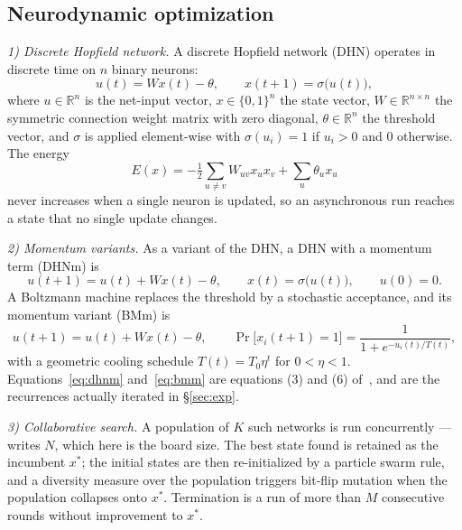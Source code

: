 \documentclass{easychair}
\newcommand{\secref}[1]{\hyperref[#1]{\textcolor{academicpurple}{\S\ref*{#1}}}}
\newcommand{\citeref}[1]{\textcolor{academicpurple}{\cite{#1}}}
\begin{document}
\subsection{Neurodynamic optimization}\label{sec:neuro}

\emph{1) Discrete Hopfield network.} A discrete Hopfield network (DHN) operates in discrete time on
$n$ binary neurons:
\begin{equation}\label{eq:dhn}
  u(t) = Wx(t) - \theta, \qquad x(t+1) = \sigma\bigl(u(t)\bigr),
\end{equation}
where $u\in\mathbb{R}^n$ is the net-input vector, $x\in\{0,1\}^n$ the state vector,
$W\in\mathbb{R}^{n\times n}$ the symmetric connection weight matrix with zero diagonal,
$\theta\in\mathbb{R}^n$ the threshold vector, and $\sigma$ is applied element-wise with
$\sigma(u_i) = 1$ if $u_i > 0$ and $0$ otherwise. The energy
\begin{equation}\label{eq:E}
  E(x) = -\tfrac12\sum_{u\neq v}W_{uv}x_ux_v + \sum_u \theta_u x_u
\end{equation}
never increases when a single neuron is updated, so an asynchronous run reaches a state that no
single update changes.

\emph{2) Momentum variants.} As a variant of the DHN, a DHN with a momentum term (DHNm) is
\begin{equation}\label{eq:dhnm}
  u(t+1) = u(t) + Wx(t) - \theta, \qquad x(t) = \sigma\bigl(u(t)\bigr), \qquad u(0) = 0 .
\end{equation}
A Boltzmann machine replaces the threshold by a stochastic acceptance, and its momentum variant
(BMm) is
\begin{equation}\label{eq:bmm}
  u(t+1) = u(t) + Wx(t) - \theta, \qquad
  \Pr\bigl[x_i(t+1) = 1\bigr] = \frac{1}{1 + e^{-u_i(t)/T(t)}},
\end{equation}
with a geometric cooling schedule $T(t) = T_0\eta^t$ for $0 < \eta < 1$. Equations~\eqref{eq:dhnm}
and~\eqref{eq:bmm} are equations (3) and (6) of~\citeref{liwang2022}, and are the recurrences
actually iterated in \secref{sec:exp}.

\emph{3) Collaborative search.} A population of $K$ such networks is run concurrently
--- \citeref{liwang2022} writes $N$, which here is the board size. The best state
found is retained as the incumbent $x^{*}$; the initial states are then re-initialized by a particle
swarm rule, and a diversity measure over the population triggers bit-flip mutation when the
population collapses onto $x^{*}$. Termination is a run of more than $M$ consecutive rounds without
improvement to $x^{*}$.
\end{document}
